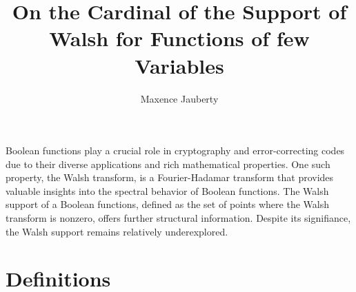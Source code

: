 \documentclass[a4paper]{article}
\title{On the Cardinal of the Support of Walsh for Functions of few Variables}
\author{Maxence Jauberty}
\begin{document}
\maketitle
Boolean functions play a crucial role in cryptography and error-correcting codes due to their
diverse applications and rich mathematical properties. One such property, the Walsh 
transform, is a Fourier-Hadamar transform that provides valuable insights into the 
spectral behavior of Boolean functions. The Walsh support of a Boolean functions, defined 
as the set of points where the Walsh transform is nonzero, offers further structural information.
Despite its signifiance, the Walsh support remains relatively underexplored.
\section{Definitions}
\end{document}
